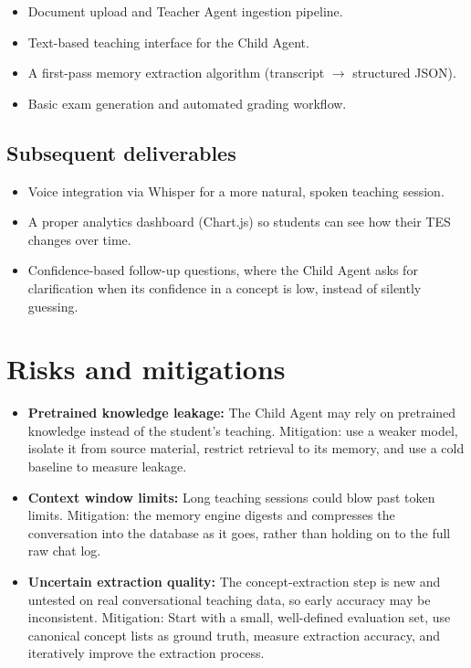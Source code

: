 \documentclass[11pt,a4paper]{article}
\newcommand{\mysection}[2]{%
    \section[#1]{#1 \hfill {\normalfont\itshape #2}}
}
\begin{document}
\begin{itemize}

    \item Document upload and Teacher Agent ingestion pipeline.

    \item Text-based teaching interface for the Child Agent.

    \item A first-pass memory extraction algorithm (transcript $\rightarrow$ structured JSON).

    \item Basic exam generation and automated grading workflow.

\end{itemize}

\subsection{Subsequent deliverables}

\begin{itemize}

    \item Voice integration via Whisper for a more natural, spoken teaching session.

    \item A proper analytics dashboard (Chart.js) so students can see how their TES changes over time.

    \item Confidence-based follow-up questions, where the Child Agent asks for clarification when its confidence in a concept is low, instead of silently guessing.

\end{itemize}


\mysection{Risks and mitigations}{}

\begin{itemize}

    \item \textbf{Pretrained knowledge leakage:} The Child Agent may rely on pretrained knowledge instead of the student's teaching. Mitigation: use a weaker model, isolate it from source material, restrict retrieval to its memory, and use a cold baseline to measure leakage.

    \item \textbf{Context window limits:} Long teaching sessions could blow past token limits. Mitigation: the memory engine digests and compresses the conversation into the database as it goes, rather than holding on to the full raw chat log.

    \item \textbf{Uncertain extraction quality:} The concept-extraction step is new and untested on real conversational teaching data, so early accuracy may be inconsistent. Mitigation: Start with a small, well-defined evaluation set, use canonical concept lists as ground truth, measure extraction accuracy, and iteratively improve the extraction process.

\end{itemize}
\end{document}
